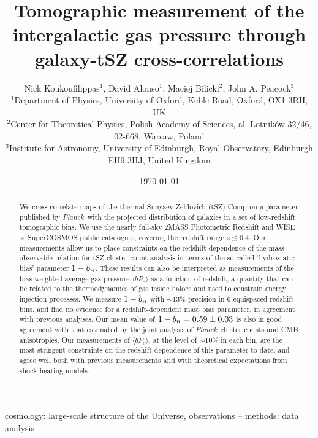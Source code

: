 \documentclass[useAMS,usenatbib]{mn2e}
\title[Tomographic measurement of the intergalactic gas pressure through galaxy-tSZ cross-correlations]{Tomographic measurement of the intergalactic gas pressure through galaxy-tSZ cross-correlations}
\author[David Alonso]{Nick Koukoufilippas$^1$, David Alonso$^1$, Maciej Bilicki$^2$, John A. Peacock$^3$\\
                      $^{1}$Department of Physics, University of Oxford, Keble Road, Oxford, OX1 3RH, UK\\
                      $^{2}$Center for Theoretical Physics, Polish Academy of Sciences, al. Lotnik\'ow 32/46, 02-668, Warsaw, Poland\\
                      $^{3}$Institute for Astronomy, University of Edinburgh, Royal Observatory, Edinburgh EH9 3HJ, United Kingdom
                      }
\def\bH{b_{\scriptscriptstyle\rm H}}
\def\planck{{\it Planck\/}}
\begin{document}
  \date{\today}
   
  \maketitle

\begin{abstract}
    We cross-correlate maps of the thermal Sunyaev-Zeldovich (tSZ) Compton-$y$ parameter published by \planck\ with the projected distribution of galaxies in a set of low-redshift tomographic bins. We use the nearly full-sky 2MASS Photometric Redshift and WISE $\times$ SuperCOSMOS public catalogues, covering the redshift range $z\lesssim0.4$. Our measurements allow us to place constraints on the redshift dependence of the mass-observable relation for tSZ cluster count analysis in terms of the so-called `hydrostatic bias' parameter $1-\bH$. These results can also be interpreted as measurements of the bias-weighted average gas pressure $\langle bP_e\rangle$ as a function of redshift, a quantity that can be related to the thermodynamics of gas inside haloes and used to constrain energy injection processes. We measure $1-\bH$ with $\sim13\%$ precision in 6 equispaced redshift bins, and find no evidence for a redshift-dependent mass bias parameter, in agreement with previous analyses. Our mean value of $1-\bH = 0.59\pm0.03$ is also in good agreement with that estimated by the joint analysis of \planck\ cluster counts and CMB anisotropies. Our measurements of $\langle bP_e\rangle$, at the level of $\sim10\%$ in each bin, are the most stringent constraints on the redshift dependence of this parameter to date, and agree well both with previous measurements and with theoretical expectations from shock-heating models.
\end{abstract}

\begin{keywords}
  cosmology: large-scale structure of the Universe, observations -- methods: data analysis
\end{keywords}
\end{document}
